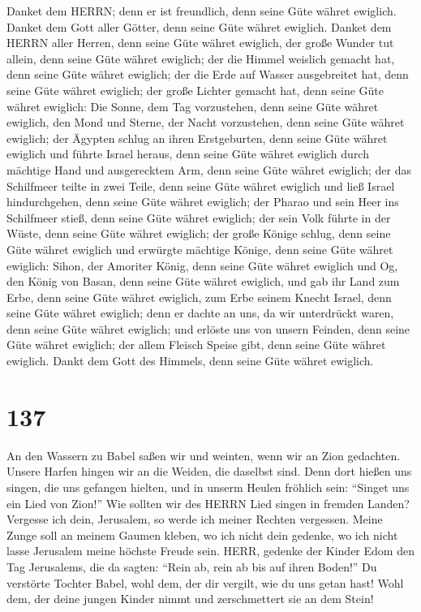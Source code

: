  Danket dem HERRN; denn er ist freundlich, denn seine Güte
währet ewiglich.  Danket dem Gott aller Götter, denn seine
Güte währet ewiglich.  Danket dem HERRN aller Herren, denn
seine Güte währet ewiglich,  der große Wunder tut allein,
denn seine Güte währet ewiglich;  der die Himmel weislich
gemacht hat, denn seine Güte währet ewiglich;  der die Erde
auf Wasser ausgebreitet hat, denn seine Güte währet ewiglich;
 der große Lichter gemacht hat, denn seine Güte währet
ewiglich:  Die Sonne, dem Tag vorzustehen, denn seine Güte
währet ewiglich,  den Mond und Sterne, der Nacht
vorzustehen, denn seine Güte währet ewiglich;  der Ägypten
schlug an ihren Erstgeburten, denn seine Güte währet ewiglich
 und führte Israel heraus, denn seine Güte währet ewiglich
 durch mächtige Hand und ausgerecktem Arm, denn seine Güte
währet ewiglich;  der das Schilfmeer teilte in zwei Teile,
denn seine Güte währet ewiglich  und ließ Israel
hindurchgehen, denn seine Güte währet ewiglich;  der Pharao
und sein Heer ins Schilfmeer stieß, denn seine Güte währet ewiglich;
 der sein Volk führte in der Wüste, denn seine Güte währet
ewiglich;  der große Könige schlug, denn seine Güte währet
ewiglich  und erwürgte mächtige Könige, denn seine Güte
währet ewiglich:  Sihon, der Amoriter König, denn seine
Güte währet ewiglich  und Og, den König von Basan, denn
seine Güte währet ewiglich,  und gab ihr Land zum Erbe,
denn seine Güte währet ewiglich,  zum Erbe seinem Knecht
Israel, denn seine Güte währet ewiglich;  denn er dachte an
uns, da wir unterdrückt waren, denn seine Güte währet ewiglich;
 und erlöste uns von unsern Feinden, denn seine Güte währet
ewiglich;  der allem Fleisch Speise gibt, denn seine Güte
währet ewiglich.  Dankt dem Gott des Himmels, denn seine
Güte währet ewiglich.

\hypertarget{section-136}{%
\section{137}\label{section-136}}

 An den Wassern zu Babel saßen wir und weinten, wenn wir an
Zion gedachten.  Unsere Harfen hingen wir an die Weiden, die
daselbst sind.  Denn dort hießen uns singen, die uns
gefangen hielten, und in unserm Heulen fröhlich sein: ``Singet uns ein
Lied von Zion!''  Wie sollten wir des HERRN Lied singen in
fremden Landen?  Vergesse ich dein, Jerusalem, so werde ich
meiner Rechten vergessen.  Meine Zunge soll an meinem Gaumen
kleben, wo ich nicht dein gedenke, wo ich nicht lasse Jerusalem meine
höchste Freude sein.  HERR, gedenke der Kinder Edom den Tag
Jerusalems, die da sagten: ``Rein ab, rein ab bis auf ihren Boden!''
 Du verstörte Tochter Babel, wohl dem, der dir vergilt, wie
du uns getan hast!  Wohl dem, der deine jungen Kinder nimmt
und zerschmettert sie an dem Stein!

